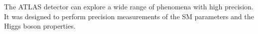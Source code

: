 

 The ATLAS detector can explore a wide range of phenomena with high precision.
 It was designed to perform precision measurements of the SM parameters and the Higgs
 boson properties.
 

 
 \begin{comment}
 The stone for the foundations of ATLAS was laid in March 1992 at the critical ‘Towards the LHC Experimental Programme’ 
 meeting, where physicists proposed several possible experiments for the LHC~\cite{LHC_fundations}. Two  %
 projects based on large toroidal magnet systems were proposed EAGLE and ASCOT. %
  By the summer of that year, both experiments merged into ATLAS. In October 1992, the letter of intent of the ATLAS
 Collaboration was sent to the LHC Experiments committee and, in 1994, the technical proposal~\cite{ATLAS_TechnicalProposal}.
 In 1997 the formal approval of the ATLAS experiment arrived and one year later the excavation on the cavern began.
 The cavern was inaugurated five years later and the construction of the ATLAS detector ended in 2008.  Later, in 2009, at
 $\CM = 2.36\,$TeV, ATLAS records its first collisions~\cite{collaboration:1228300}. 
\end{comment}
 
 
